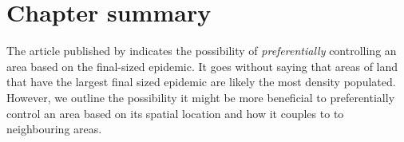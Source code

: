 

\section{Chapter summary}

The article published by \cite{time-varying-infectivity} indicates the possibility of \textit{preferentially} controlling an area based on the final-sized epidemic. It goes without saying that areas of land that have the largest final sized epidemic are likely the most density populated. However, we outline the possibility it might be more beneficial to preferentially control an area based on its spatial location and how it couples to to neighbouring areas.








